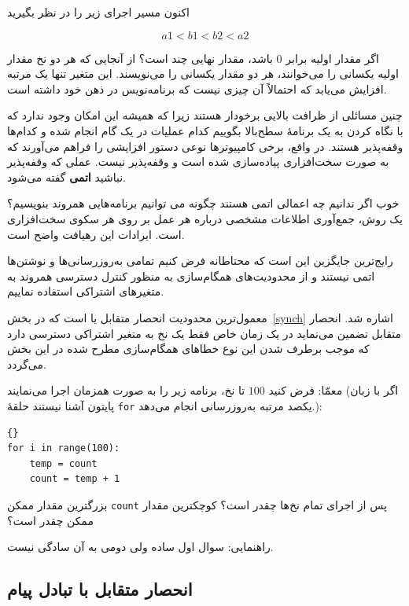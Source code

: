 \documentclass{book}
\begin{document}
    اکنون مسیر اجرای زیر را در نظر بگیرید
    
\[  a1 < b1 < b2 < a2  \]

    اگر مقدار اولیه  برابر \texttt{$0$} باشد، مقدار نهایی چند است؟
    از آنجایی که هر دو نخ مقدار اولیه یکسانی را می‌خوانند، هر دو مقدار یکسانی را می‌نویسند. 
    این متغیر تنها یک مرتبه افزایش می‌یابد که احتمالاً آن چیزی نیست که برنامه‌نویس در ذهن خود داشته است. 

    چنین مسائلی از ظرافت بالایی برخودار هستند 
    زیرا که     همیشه این امکان وجود ندارد که با نگاه کردن به یک برنامهٔ سطح‌بالا 
    بگوییم کدام عملیات در یک گام انجام شده و کدام‌ها وقفه‌پذیر هستند. 
    در واقع،‌ برخی کامپیوترها نوعی دستور افزایشی را فراهم می‌آورند که به صورت سخت‌افزاری پیاده‌سازی شده است و وقفه‌پذیر نیست. 
    عملی که وقفه‌پذیر نباشید \textbf{اتمی} گفته می‌شود. 

    خوب اگر ندانیم چه اعمالی اتمی هستند چگونه می توانیم برنامه‌هایی همروند بنویسیم؟
    یک روش، جمع‌آوری اطلاعات مشخصی درباره هر عمل بر روی هر سکوی سخت‌افزاری است. 
    ایرادات این رهیافت  واضح است. 

    رایج‌ترین جایگزین این است که محتاطانه فرض کنیم تمامی به‌روزرسانی‌ها و نوشتن‌ها اتمی نیستند و 
    از محدودیت‌های همگام‌سازی به منظور کنترل دسترسی همروند به متغیرهای اشتراکی استفاده نماییم. 

    معمول‌ترین محدودیت انحصار متقابل یا  است که 
    در بخش~\ref{synch}  اشاره شد. انحصار متقابل تضمین می‌نماید در یک زمان خاص  فقط یک نخ به متغیر اشتراکی دسترسی دارد 
    که موجب برطرف شدن این نوع خطاهای همگام‌سازی مطرح شده در این بخش می‌گردد. 
    
    معمّا: فرض کنید $100$ تا نخ، برنامه زیر را به صورت همزمان اجرا می‌نمایند (اگر با زبان پایتون آشنا نیستند حلقهٔ \texttt{for} یکصد مرتبه 
    به‌روزرسانی انجام می‌دهد.):

\begin{latin}
\begin{lstlisting}[]{}
for i in range(100):
    temp = count
    count = temp + 1
\end{lstlisting}
\end{latin}

    بزرگترین مقدار ممکن \texttt{count} پس از اجرای تمام نخ‌ها چقدر است؟ کوچکترین مقدار ممکن چقدر است؟ 
    

    راهنمایی: سوال اول ساده ولی دومی به آن سادگی نیست. 

\subsection {انحصار متقابل با تبادل پیام}
\end{document}

